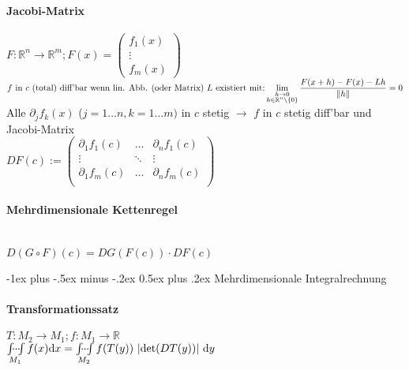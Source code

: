 \documentclass[paper=a3,paper=landscape, fontsize=9pt,DIV=25]{scrartcl}
\makeatletter
\newcommand{\real}{{\mathbb{R}}}
\renewcommand{\section}{\@startsection{section}{1}{0mm}%
  {-1ex plus -.5ex minus -.2ex}%
  {0.5ex plus .2ex}%
  {\color{blue}\normalfont\large\bfseries}}
\makeatother
\begin{document}
\begin{multicols*}{4}
  \paragraph{Jacobi-Matrix}

  $F: \real^n \rightarrow \real^m; F(x) =
  \begin{pmatrix}
    f_1(x)\\
    \vdots \\
    f_m(x)
  \end{pmatrix}
  $ \\
  $f \ \text{in}\ c \ \text{(total) diff'bar wenn lin. Abb. (oder Matrix)}\ L \ \text{existiert mit:}\\ \displaystyle\lim_{\substack{h \rightarrow 0\\ h \in \real^n \setminus \{0\} }} \frac{F(x+h)-F(x)-Lh}{\|h\|} = 0$\\
  Alle $\partial_jf_k(x)$ ($j=1 \dots n,k=1 \dots m)$ in $c$ stetig $\rightarrow$ $f$ in $c$ stetig diff'bar und Jacobi-Matrix \\
  $DF(c) :=
  \begin{pmatrix}
    \partial_1f_1(c) & \dots   & \partial_nf_1(c) \\
    \vdots           & \ddots  & \vdots          \\
    \partial_1f_m(c) & \dots   & \partial_nf_m(c) \\
  \end{pmatrix}
  $

  \paragraph{Mehrdimensionale Kettenregel}\hspace{0pt} \\
  $D(G \circ F)(c) = DG(F(c)) \cdot DF(c)$


  
  \section{Mehrdimensionale Integralrechnung}


  \paragraph{Transformationssatz}
  $ T: M_2 \rightarrow M_1; f: M_1 \rightarrow \real $\\
  $ \idotsint \limits_{M_1}f(x)\mathrm{d}x = \idotsint \limits_{M_2}f(T(y)) \ |\mathrm{det}(DT(y))| \ \mathrm{d}y $



\end{multicols*}
\end{document}
